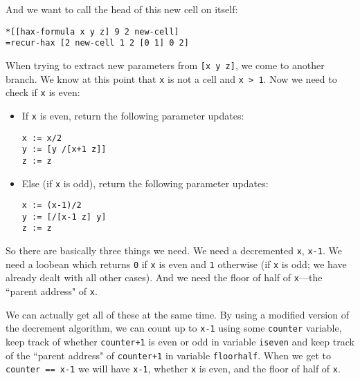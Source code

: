 \documentclass[twoside]{article}
\begin{document}
\noindent
And we want to call the head of this new cell on itself:

\begin{lstlisting}[style=listingblock]
*[[hax-formula x y z] 9 2 new-cell]
=recur-hax [2 new-cell 1 2 [0 1] 0 2]
\end{lstlisting}

\noindent
When trying to extract new parameters from \lstinline[style=inlinecode]{[x y z]}, we come to another branch. We know at this point that \lstinline[style=inlinecode]{x} is not a cell and \lstinline[style=inlinecode]{x > 1}. Now we need to check if \lstinline[style=inlinecode]{x} is even:

\begin{itemize}
  \item  If \lstinline[style=inlinecode]{x} is even, return the following parameter updates:

\begin{lstlisting}[style=listingblock]
x := x/2
y := [y /[x+1 z]]
z := z
\end{lstlisting}

  \item  Else (if \lstinline[style=inlinecode]{x} is odd), return the following parameter updates:

\begin{lstlisting}[style=listingblock]
x := (x-1)/2
y := [/[x-1 z] y]
z := z
\end{lstlisting}

\end{itemize}

\noindent
So there are basically three things we need. We need a decremented \lstinline[style=inlinecode]{x}, \lstinline[style=inlinecode]{x-1}. We need a loobean which returns \lstinline[style=inlinecode]{0} if \lstinline[style=inlinecode]{x} is even and \lstinline[style=inlinecode]{1} otherwise (if \lstinline[style=inlinecode]{x} is odd; we have already dealt with all other cases). And we need the floor of half of \lstinline[style=inlinecode]{x}---the ``parent address" of \lstinline[style=inlinecode]{x}.

We can actually get all of these at the same time. By using a modified version of the decrement algorithm, we can count up to \lstinline[style=inlinecode]{x-1} using some \lstinline[style=inlinecode]{counter} variable, keep track of whether \lstinline[style=inlinecode]{counter+1} is even or odd in variable \lstinline[style=inlinecode]{iseven} and keep track of the ``parent address" of \lstinline[style=inlinecode]{counter+1} in variable \lstinline[style=inlinecode]{floorhalf}. When we get to \lstinline[style=inlinecode]{counter == x-1} we will have \lstinline[style=inlinecode]{x-1}, whether \lstinline[style=inlinecode]{x} is even, and the floor of half of \lstinline[style=inlinecode]{x}.
\end{document}
